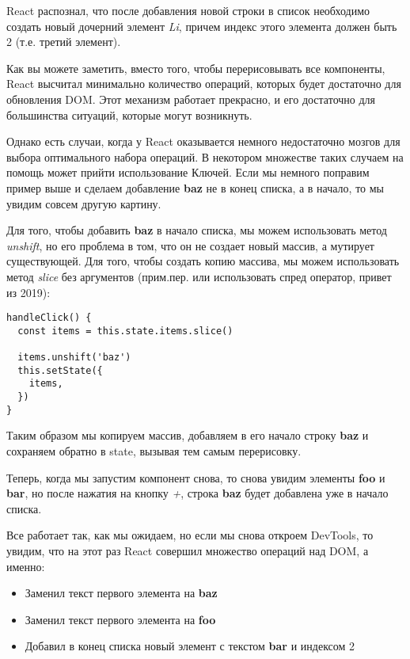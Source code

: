 React распознал, что после добавления новой строки в список необходимо создать новый дочерний элемент \textit{Li}, причем индекс этого элемента должен быть 2 (т.е. третий элемент).

Как вы можете заметить, вместо того, чтобы перерисовывать все компоненты, React высчитал минимально количество операций, которых будет достаточно для обновления DOM. Этот механизм работает прекрасно, и его достаточно для большинства ситуаций, которые могут возникнуть.

Однако есть случаи, когда у React оказывается немного недостаточно мозгов для выбора оптимального набора операций. В некотором множестве таких случаем на помощь может прийти использование Ключей. Если мы немного поправим пример выше и сделаем добавление \textbf{baz} не в конец списка, а в начало, то мы увидим совсем другую картину. 

Для того, чтобы добавить \textbf{baz} в начало списка, мы можем использовать метод \textit{unshift}, но его проблема в том, что он не создает новый массив, а мутирует существующей. Для того, чтобы создать копию массива, мы можем использовать метод \textit{slice} без аргументов (прим.пер. или использовать спред оператор, привет из 2019):

\begin{lstlisting}
handleClick() {
  const items = this.state.items.slice()
  
  items.unshift('baz')
  this.setState({
    items,
  })
}
\end{lstlisting}

Таким образом мы копируем массив, добавляем в его начало строку \textbf{baz} и сохраняем обратно в state, вызывая тем самым перерисовку.

Теперь, когда мы запустим компонент снова, то снова увидим элементы \textbf{foo} и \textbf{bar}, но после нажатия на кнопку \textit{+}, строка \textbf{baz} будет добавлена уже в начало списка.

Все работает так, как мы ожидаем, но если мы снова откроем DevTools, то увидим, что на этот раз React совершил множество операций над DOM, а именно:

\begin{itemize}
  \item Заменил текст первого элемента на \textbf{baz}
  \item Заменил текст первого элемента на \textbf{foo}
  \item Добавил в конец списка новый элемент с текстом \textbf{bar} и индексом 2
\end{itemize}

